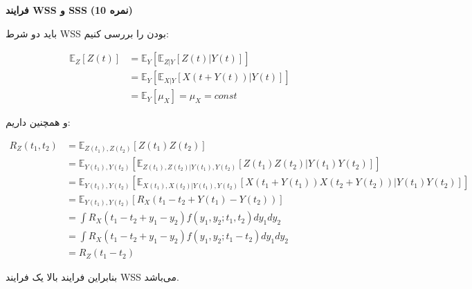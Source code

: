 \Large \textbf{فرایند WSS و SSS}
\large \textbf{(10 نمره)}

\normalsize \vspace{0.5cm}
باید دو شرط WSS بودن را بررسی کنیم:

$$
\begin{aligned}
	{\mathbb{E}_Z}\left[ {Z\left( t \right)} \right] & = {\mathbb{E}_Y}\left[ {{\mathbb{E}_{Z|Y}}\left[ {Z\left( t \right)|Y\left( t \right)} \right]} \right]\\
	&‌= {\mathbb{E}_Y}\left[ {{\mathbb{E}_{X|Y}}\left[ {X\left( {t + Y\left( t \right)} \right)|Y\left( t \right)} \right]} \right]\\
	& = {\mathbb{E}_Y}\left[ {{\mu _X}} \right] = {\mu _X} = const
\end{aligned}
$$

و همچنین داریم:

$$
\begin{aligned}
	{R_Z}\left( {{t_1},{t_2}} \right) & = {\mathbb{E}_{Z\left( {{t_1}} \right),Z\left( {{t_2}} \right)}}\left[ {Z\left( {{t_1}} \right)Z\left( {{t_2}} \right)} \right] \\
	& = {\mathbb{E}_{Y\left( {{t_1}} \right),Y\left( {{t_2}} \right)}}\left[ {{\mathbb{E}_{Z\left( {{t_1}} \right),Z\left( {{t_2}} \right)|Y\left( {{t_1}} \right),Y\left( {{t_2}} \right)}}\left[ {Z\left( {{t_1}} \right)Z\left( {{t_2}} \right)|Y\left( {{t_1}} \right)Y\left( {{t_2}} \right)} \right]} \right] \\
	&‌= {\mathbb{E}_{Y\left( {{t_1}} \right),Y\left( {{t_2}} \right)}}\left[ {{\mathbb{E}_{X\left( {{t_1}} \right),X\left( {{t_2}} \right)|Y\left( {{t_1}} \right),Y\left( {{t_2}} \right)}}\left[ {X\left( {{t_1} + Y\left( {{t_1}} \right)} \right)X\left( {{t_2} + Y\left( {{t_2}} \right)} \right)|Y\left( {{t_1}} \right)Y\left( {{t_2}} \right)} \right]} \right]\\
	& = {\mathbb{E}_{Y\left( {{t_1}} \right),Y\left( {{t_2}} \right)}}\left[ {{R_X}\left( {{t_1} - {t_2} + Y\left( {{t_1}} \right) - Y\left( {{t_2}} \right)} \right)} \right]\\
	& = \int {{R_X}\left( {{t_1} - {t_2} + {y_1} - {y_2}} \right)f\left( {{y_1},{y_2};{t_1},{t_2}} \right)d{y_1}d{y_2}} \\
	&‌= \int {{R_X}\left( {{t_1} - {t_2} + {y_1} - {y_2}} \right)f\left( {{y_1},{y_2};{t_1} - {t_2}} \right)d{y_1}d{y_2}} \\
	&‌= {R_Z}\left( {{t_1} - {t_2}} \right)
\end{aligned}
$$


بنابراین فرایند بالا یک فرایند WSS می‌باشد.